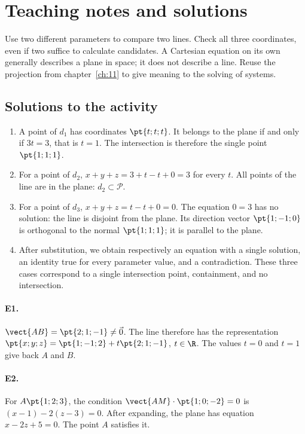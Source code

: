 \ifmxteacher\mxnewpage\section{Teaching notes and solutions}\begin{teachernote}Use two different parameters to compare two lines. Check all three coordinates, even if two suffice to calculate candidates. A Cartesian equation on its own generally describes a plane in space; it does not describe a line. Reuse the projection from chapter~\ref{ch:11} to give meaning to the solving of systems.\end{teachernote}

\subsection{Solutions to the activity}\begin{enumerate}
\item A point of $d_1$ has coordinates $\pt{t;t;t}$. It belongs to the plane if and only if $3t=3$, that is $t=1$. The intersection is therefore the single point $\pt{1;1;1}$.
\item For a point of $d_2$, $x+y+z=3+t-t+0=3$ for every $t$. All points of the line are in the plane: $d_2\subset\mathcal P$.
\item For a point of $d_3$, $x+y+z=t-t+0=0$. The equation $0=3$ has no solution: the line is disjoint from the plane. Its direction vector $\pt{1;-1;0}$ is orthogonal to the normal $\pt{1;1;1}$; it is parallel to the plane.
\item After substitution, we obtain respectively an equation with a single solution, an identity true for every parameter value, and a contradiction. These three cases correspond to a single intersection point, containment, and no intersection.
\end{enumerate}

\paragraph{E1.}$\vect{AB}=\pt{2;1;-1}\ne\vec0$. The line therefore has the representation $\pt{x;y;z}=\pt{1;-1;2}+t\pt{2;1;-1}$, $t\in\R$. The values $t=0$ and $t=1$ give back $A$ and $B$.

\paragraph{E2.}For $A\pt{1;2;3}$, the condition $\vect{AM}\cdot\pt{1;0;-2}=0$ is $(x-1)-2(z-3)=0$. After expanding, the plane has equation $x-2z+5=0$. The point $A$ satisfies it.

